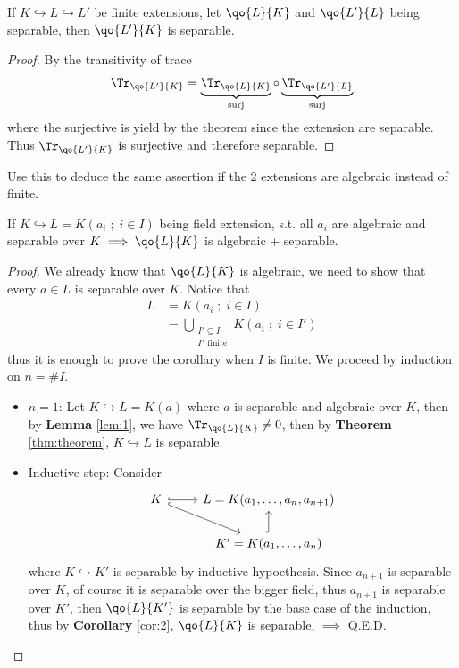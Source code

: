 \begin{corollary}
	\label{cor:1}
	If \( K \hookrightarrow L \hookrightarrow L' \) be finite extensions, let \( \qo{L}{K} \) and \(
	\qo{L'}{L} \) being separable, then \( \qo{L'}{K} \) is separable.
\end{corollary}

\begin{proof}
	By the transitivity of trace
	\[
		\Tr_{\qo{L'}{K}} = \underbrace{\Tr_{\qo{L}{K}}}_{\text{surj}} \circ \underbrace{\Tr_{\qo{L'}{L}}}_{\text{surj}}
	\]
	where the surjective is yield by the theorem since the extension are separable. Thus \(
	\Tr_{\qo{L'}{K}} \) is surjective and therefore separable.
\end{proof}

\begin{exercise}
	Use this to deduce the same assertion if the 2 extensions are algebraic instead of finite.
\end{exercise}

\begin{corollary}
	\label{cor:2}
	If \( K \hookrightarrow L = K(a_{i} \; ; \; i\in I) \) being field extension, s.t. all \( a_i \) are
	algebraic and separable over \( K \implies \qo{L}{K} \) is algebraic + separable.
\end{corollary}

\begin{proof}
	We already know that \( \qo{L}{K} \) is algebraic, we need to show that every \( a\in L \) is
	separable over \( K \). Notice that
	\[
		\begin{aligned}
			L & = K (a_i \; ; \; i \in I)           \\
			  & = \bigcup_{\substack{I' \subseteq I \\ I' \text{ finite}}} K(a_i \; ; \; i \in I')
		\end{aligned}
	\]
	thus it is enough to prove the corollary when \( I \) is finite. We proceed by induction on \( n =
	\# I\).
	\begin{itemize}
		\item \( n = 1 \): Let \( K \hookrightarrow L = K(a) \) where \( a \) is separable and algebraic
		      over \( K \), then by \textbf{Lemma} \ref{lem:1}, we have \( \Tr_{\qo{L}{K}}
		      \ne 0 \), then by \textbf{Theorem} \ref{thm:theorem}, $K \hookrightarrow
			      L$ is separable.
		\item Inductive step: Consider
		      \[
			      \begin{tikzcd}
				      K  \arrow[r, hook] \arrow[rd, hook] & L = K(a_1,\ldots, a_n, a_{n+1}) \\
				      & K' = K(a_1,\ldots, a_n) \arrow[u, hook]
			      \end{tikzcd}
		      \]
		      where \( K \hookrightarrow K' \) is separable by inductive hypoethesis. Since \( a_{n+1} \) is separable
		      over \( K \), of course it is separable over the bigger field, thus \( a_{n+1} \) is
		      separable over \( K' \), then \( \qo{L}{K'} \) is separable by the base case of the
		      induction, thus by \textbf{Corollary} \ref{cor:2}, \( \qo{L}{K} \) is
		      separable, \( \implies \) Q.E.D.
	\end{itemize}
\end{proof}

